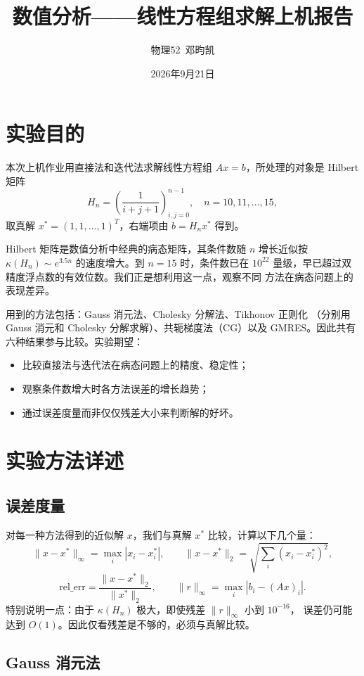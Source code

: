 \documentclass[UTF8]{ctexart}
\title{数值分析——线性方程组求解上机报告}
\author{物理52~邓昀凯}
\date{2026年9月21日}
\begin{document}
\maketitle

\section{实验目的}

本次上机作业用直接法和迭代法求解线性方程组 $Ax=b$，所处理的对象是
Hilbert 矩阵
\[
H_n = \left(\frac{1}{i+j+1}\right)_{i,j=0}^{n-1},\quad n=10,11,\dots,15,
\]
取真解 $x^*=(1,1,\dots,1)^T$，右端项由 $b=H_n x^*$ 得到。

Hilbert 矩阵是数值分析中经典的病态矩阵，其条件数随 $n$ 增长近似按
$\kappa(H_n)\sim e^{3.5n}$ 的速度增大。到 $n=15$ 时，条件数已在 $10^{22}$
量级，早已超过双精度浮点数的有效位数。我们正是想利用这一点，观察不同
方法在病态问题上的表现差异。

用到的方法包括：Gauss 消元法、Cholesky 分解法、Tikhonov 正则化
（分别用 Gauss 消元和 Cholesky 分解求解）、共轭梯度法（CG）以及
GMRES。因此共有六种结果参与比较。实验期望：

\begin{itemize}
  \item 比较直接法与迭代法在病态问题上的精度、稳定性；
  \item 观察条件数增大时各方法误差的增长趋势；
  \item 通过误差度量而非仅仅残差大小来判断解的好坏。
\end{itemize}

\section{实验方法详述}

\subsection{误差度量}

对每一种方法得到的近似解 $x$，我们与真解 $x^*$ 比较，计算以下几个量：
\[
\|x-x^*\|_\infty=\max_i |x_i-x_i^*|,\qquad
\|x-x^*\|_2=\sqrt{\sum_i (x_i-x_i^*)^2},
\]
\[
\text{rel\_err}=\frac{\|x-x^*\|_2}{\|x^*\|_2},\qquad
\|r\|_\infty=\max_i |b_i-(Ax)_i|.
\]
特别说明一点：由于 $\kappa(H_n)$ 极大，即使残差 $\|r\|_\infty$ 小到 $10^{-16}$，
误差仍可能达到 $O(1)$。因此仅看残差是不够的，必须与真解比较。

\subsection{Gauss 消元法}
\end{document}
